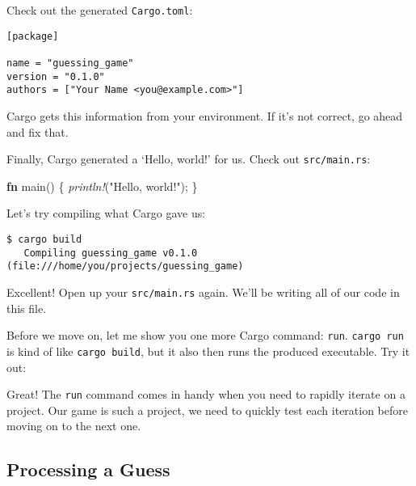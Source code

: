 \documentclass[a4paper,]{book}
\newenvironment{Shaded}{\begin{snugshade}}{\end{snugshade}}
\newcommand{\KeywordTok}[1]{\textcolor[rgb]{0.13,0.29,0.53}{\textbf{{#1}}}}
\newcommand{\StringTok}[1]{\textcolor[rgb]{0.31,0.60,0.02}{{#1}}}
\newcommand{\PreprocessorTok}[1]{\textcolor[rgb]{0.56,0.35,0.01}{\textit{{#1}}}}
\newcommand{\NormalTok}[1]{{#1}}
\begin{document}
Check out the generated \texttt{Cargo.toml}:

\begin{verbatim}
[package]

name = "guessing_game"
version = "0.1.0"
authors = ["Your Name <you@example.com>"]
\end{verbatim}

Cargo gets this information from your environment. If it's not correct,
go ahead and fix that.

Finally, Cargo generated a `Hello, world!' for us. Check out
\texttt{src/main.rs}:

\begin{Shaded}
\begin{Highlighting}[]
\KeywordTok{fn} \NormalTok{main() \{}
    \PreprocessorTok{println!}\NormalTok{(}\StringTok{"Hello, world!"}\NormalTok{);}
\NormalTok{\}}
\end{Highlighting}
\end{Shaded}

Let's try compiling what Cargo gave us:

\begin{verbatim}
$ cargo build
   Compiling guessing_game v0.1.0 (file:///home/you/projects/guessing_game)
\end{verbatim}

Excellent! Open up your \texttt{src/main.rs} again. We'll be writing all
of our code in this file.

Before we move on, let me show you one more Cargo command: \texttt{run}.
\texttt{cargo\ run} is kind of like \texttt{cargo\ build}, but it also
then runs the produced executable. Try it out:

\begin{Shaded}
\end{Shaded}

Great! The \texttt{run} command comes in handy when you need to rapidly
iterate on a project. Our game is such a project, we need to quickly
test each iteration before moving on to the next one.

\subsection{Processing a Guess}\label{processing-a-guess}
\end{document}

